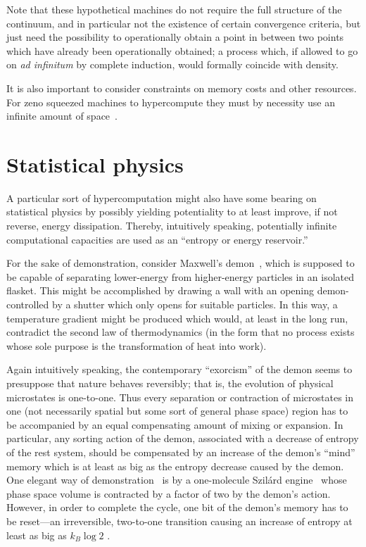 \documentclass{comjnl}
\begin{document}
Note that these hypothetical machines do not require the full structure of the continuum,
and in particular not the existence of certain convergence criteria, but just need the possibility to operationally
obtain a point in between two points which have already been operationally obtained; a process which,
if allowed to go on {\it ad infinitum} by complete induction, would formally coincide with density.

It is also important to consider constraints on memory costs and other resources.
For zeno squeezed machines to hypercompute they must by necessity use an infinite amount of space~\cite{calude-staiger-09}.

\section{Statistical physics}

A particular sort of hypercomputation might also have some bearing on statistical physics by possibly yielding potentiality to at least
improve, if not reverse, energy dissipation. Thereby, intuitively speaking, potentially infinite computational capacities are used as an ``entropy or energy reservoir.''

For the sake of demonstration, consider Maxwell's demon~\cite{maxwell-demon2},
which is supposed to be capable of separating lower-energy from higher-energy particles in an isolated flasket.
This might be accomplished by drawing a wall with an opening demon-controlled by a shutter which only opens for suitable particles.
In this way, a temperature gradient might be produced which would, at least in the long run, contradict the second law of thermodynamics
(in the form that no process exists whose sole purpose is the transformation of heat into work).

Again intuitively speaking, the contemporary ``exorcism'' of the demon seems to presuppose that nature behaves reversibly;
that is, the evolution of physical microstates is one-to-one.
Thus every separation or contraction of microstates in one (not necessarily spatial but some sort of general phase space) region
has to be accompanied by an equal compensating amount of mixing or expansion.
In particular, any sorting action of the demon,
associated with a decrease of entropy of the rest system,
should be compensated by an increase of the demon's ``mind'' memory which is at least as big as the entropy decrease caused by the demon.
One elegant way of demonstration~\cite[pp.~927-929]{bennett-82} is by a one-molecule Szil\'ard engine~\cite[pp.~843--844]{Szilard-1929}
whose phase space volume is contracted by a factor of two by the demon's action.
However, in order to complete the cycle, one bit of the demon's memory has to be reset---an irreversible, two-to-one transition causing an increase
of entropy at least as big as  $k_B \log 2$ \cite{landauer:61}.
\end{document}

